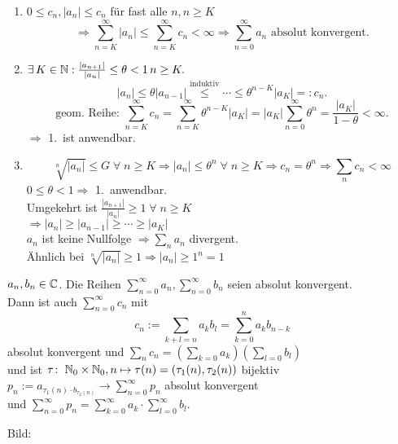 \documentclass[../ana1.tex]{subfiles}
\begin{document}
\begin{bew}\leavevmode
    \begin{enumerate}
        \item \( 0 \leq c_n, |a_n| \leq c_n \) für fast alle \( n, n\geq K\)
        \[ \Rightarrow \sum_{n=K}^{\infty} |a_n| \leq \sum_{n=K}^\infty c_n < \infty \Rightarrow \sum_{n=0}^\infty a_n \text{ absolut konvergent.} \]
        \item \( \exists \, K\in\mathbb{N}: \frac{|a_{n+1}|}{|a_n|} \leq \theta < 1 \, n\geq K. \)
        \[ |a_n| \leq \theta |a_{n-1}| \overset{\text{induktiv}}{\leq} \cdots \leq \theta^{n-K}|a_K| =: c_n. \]
        \[ \text{geom. Reihe: } \sum_{n=K}^\infty c_n = \sum_{n=K}^\infty \theta^{n-K}|a_K| = |a_K| \sum_{n=0}^\infty \theta^n = \frac{|a_K|}{1-\theta} < \infty. \]
        \( \Rightarrow \) 1.\ ist anwendbar. 
        \item \[ \sqrt[n]{|a_n|} \leq G \;\forall \; n\geq K \Rightarrow |a_n| \leq \theta^n \;\forall \; n\geq K \Rightarrow c_n = \theta^n \Rightarrow \sum_n c_n < \infty \]
        \( 0 \leq \theta < 1 \Rightarrow \) 1.\ anwendbar.\\
        Umgekehrt ist \( \frac{|a_{n+1}|}{|a_n|} \geq 1 \;\forall \; n\geq K \) \\
        \( \Rightarrow |a_n| \geq |a_{n-1}| \geq \cdots \geq |a_K| \) \\
        \( a_n \) ist keine Nullfolge \( \Rightarrow \sum_n a_n \) divergent.\\
        Ähnlich bei \( \sqrt[n]{|a_n|} \geq 1 \Rightarrow |a_n| \geq 1^n = 1 \)
    \end{enumerate}
\end{bew}
\begin{satz}[Cauchyprodukt]
    \( a_n, b_n \in\mathbb{C} \). Die Reihen \( \sum_{n=0}^\infty a_n, \sum_{n=0}^\infty b_n \) seien absolut konvergent.\\
    Dann ist auch \( \sum_{n=0}^\infty c_n \) mit 
    \[ c_n := \sum_{k+l=n} a_k b_l = \sum_{k=0}^n a_k b_{n-k} \]
    absolut konvergent und \( \sum_n c_n = ( \sum_{k=0} a_k )( \sum_{l=0} b_l ) \) \\
    und ist \(\tau \colon \; \mathbb{N}_0 \times \mathbb{N}_0, n \mapsto \tau(n) = (\tau_1(n), \tau_2(n)) \) bijektiv
    \( p_n := a_{\tau_1(n) \cdot b_{\tau_2(n)}} \rightarrow \sum_{n=0}^\infty p_n \) absolut konvergent \\
    und \( \sum_{n=0}^\infty p_n = \sum_{k=0}^\infty a_k \cdot \sum_{l=0}^\infty b_l \).
\end{satz}
Bild:\\
\end{document}
